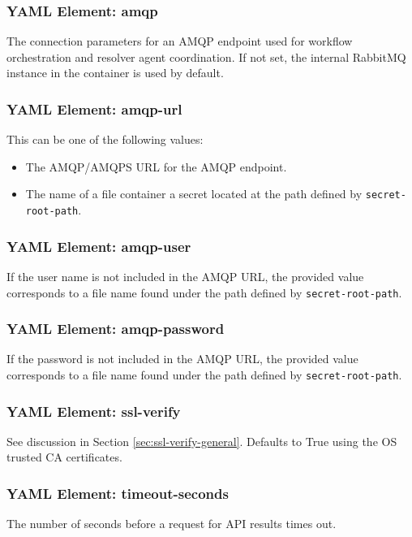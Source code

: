 \subsubsection{YAML Element: amqp}\label{sec:yaml-generic-amqp}
The connection parameters for an AMQP endpoint used for workflow orchestration and resolver agent coordination. 
If not set, the internal RabbitMQ instance in the \cxoneflow container is used by default.

\subsubsection{YAML Element: amqp-url}\label{sec:yaml-generic-amqp-amqp-url}
This can be one of the following values:

\begin{itemize}
  \item The AMQP/AMQPS URL for the AMQP endpoint.
  \item The name of a file container a secret located at the path defined by \texttt{secret-root-path}.
\end{itemize}


\subsubsection{YAML Element: amqp-user}\label{sec:yaml-generic-amqp-amqp-user}
If the user name is not included in the AMQP URL, the provided value corresponds to a file name found under
the path defined by \texttt{secret-root-path}.

\subsubsection{YAML Element: amqp-password}\label{sec:yaml-generic-amqp-amqp-password}
If the password is not included in the AMQP URL, the provided value corresponds to a file name found
under the path defined by \texttt{secret-root-path}.


\subsubsection{YAML Element: ssl-verify}\label{sec:yaml-generic-ssl-verify}
See discussion in Section \ref{sec:ssl-verify-general}.  Defaults to True using the OS trusted CA certificates.

\subsubsection{YAML Element: timeout-seconds}\label{sec:yaml-generic-timeout-seconds}
The number of seconds before a request for API results times out.

